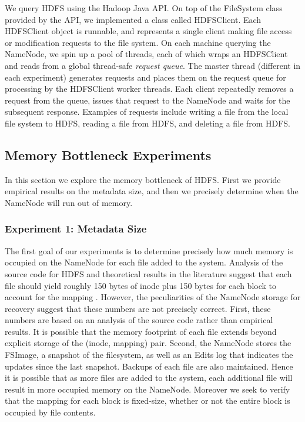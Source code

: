 \documentclass[11pt, a4paper]{article}
\begin{document}
\begin{multicols*}{2}
We query HDFS using the Hadoop Java API. On top of the FileSystem class provided by the API, we implemented a class called HDFSClient. Each HDFSClient object is runnable, and represents a single client making file access or modification requests to the file system. On each machine querying the NameNode, we spin up a pool of threads, each of which wraps an HDFSClient and reads from a global thread-safe \textit{request queue}. The master thread (different in each experiment) generates requests and places them on the request queue for processing by the HDFSClient worker threads. Each client repeatedly removes a request from the queue, issues that request to the NameNode and waits for the subsequent response. Examples of requests include writing a file from the local file system to HDFS, reading a file from HDFS, and deleting a file from HDFS.

\subsection{Memory Bottleneck Experiments}
In this section we explore the memory bottleneck of HDFS. First we provide empirical results on the metadata size, and then we precisely determine when the NameNode will run out of memory.
\subsubsection{Experiment 1: Metadata Size}\label{MetadataSize}
The first goal of our experiments is to determine precisely how much memory is occupied on the NameNode for each file added to the system. Analysis of the source code for HDFS and theoretical results in the literature suggest that each file should yield roughly 150 bytes of inode plus 150 bytes for each block to account for the mapping \cite{HdfsArch, HdfsScale}. However, the peculiarities of the NameNode storage for recovery suggest that these numbers are not precisely correct. First, these numbers are based on an analysis of the source code rather than empirical results. It is possible that the memory footprint of each file extends beyond explicit storage of the (inode, mapping) pair. Second, the NameNode stores the FSImage, a snapshot of the filesystem, as well as an Edits log that indicates the updates since the last snapshot. Backups of each file are also maintained. Hence it is possible that as more files are added to the system, each additional file will result in more occupied memory on the NameNode. Moreover we seek to verify that the mapping for each block is fixed-size, whether or not the entire block is occupied by file contents.


\end{multicols*}
\end{document}
